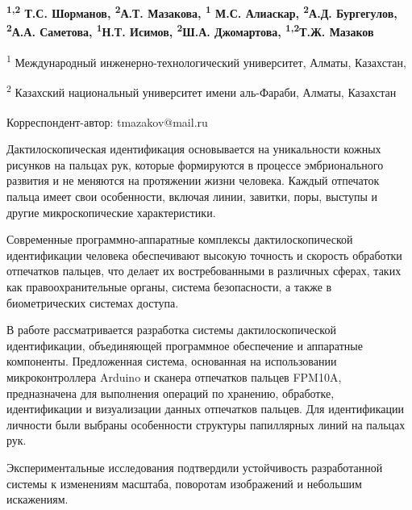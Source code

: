 
\begin{articleheader}

{\bfseries \textsuperscript{1,2}
Т.С. Шорманов, \textsuperscript{2}А.Т.  Мазакова, \textsuperscript{1}
М.С. Алиаскар, \textsuperscript{2}А.Д.
Бургегулов, \textsuperscript{2}А.А. Саметова, \textsuperscript{1}Н.Т. Исимов, \textsuperscript{2}Ш.А.
Джомартова, \textsuperscript{1,2}Т.Ж. Мазаков\textsuperscript{\envelope }}
\end{articleheader}

\begin{affiliation}
\textsuperscript{1} Международный инженерно-технологический университет,
Алматы, Казахстан,

\textsuperscript{2} Казахский национальный университет имени аль-Фараби,
Алматы, Казахстан

{\bfseries \textsuperscript{\envelope }}Корреспондент-автор: tmazakov@mail.ru
\end{affiliation}

Дактилоскопическая идентификация основывается на уникальности кожных
рисунков на пальцах рук, которые формируются в процессе эмбрионального
развития и не меняются на протяжении жизни человека. Каждый отпечаток
пальца имеет свои особенности, включая линии, завитки, поры, выступы и
другие микроскопические характеристики.

Современные программно-аппаратные комплексы дактилоскопической
идентификации человека обеспечивают высокую точность и скорость
обработки отпечатков пальцев, что делает их востребованными в различных
сферах, таких как правоохранительные органы, система безопасности, а
также в биометрических системах доступа.

В работе рассматривается разработка системы дактилоскопической
идентификации, объединяющей программное обеспечение и аппаратные
компоненты. Предложенная система, основанная на использовании
микроконтроллера Arduino и сканера отпечатков пальцев FPM10A,
предназначена для выполнения операций по хранению, обработке,
идентификации и визуализации данных отпечатков пальцев. Для
идентификации личности были выбраны особенности структуры папиллярных
линий на пальцах рук.

Экспериментальные исследования подтвердили устойчивость разработанной
системы к изменениям масштаба, поворотам изображений и небольшим
искажениям.

